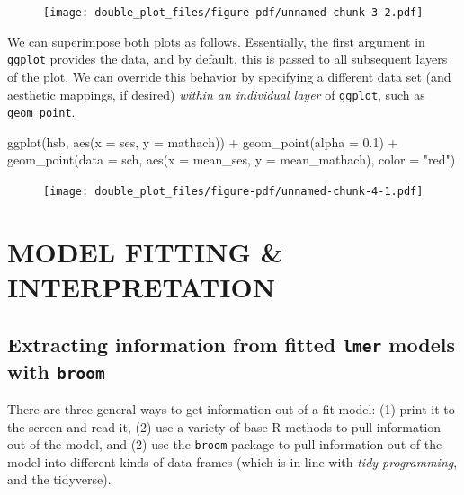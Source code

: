 \documentclass[
  letterpaper,
  DIV=11,
  numbers=noendperiod]{scrreprt}
\newenvironment{Shaded}{\begin{snugshade}}{\end{snugshade}}
\newcommand{\AttributeTok}[1]{\textcolor[rgb]{0.49,0.56,0.16}{#1}}
\newcommand{\FloatTok}[1]{\textcolor[rgb]{0.25,0.63,0.44}{#1}}
\newcommand{\FunctionTok}[1]{\textcolor[rgb]{0.02,0.16,0.49}{#1}}
\newcommand{\NormalTok}[1]{\textcolor[rgb]{0.00,0.44,0.13}{#1}}
\newcommand{\SpecialCharTok}[1]{\textcolor[rgb]{0.25,0.44,0.63}{#1}}
\newcommand{\StringTok}[1]{\textcolor[rgb]{0.25,0.44,0.63}{#1}}
\begin{document}
\begin{figure}[H]

{\centering \texttt{[image: double\_plot\_files/figure-pdf/unnamed-chunk-3-2.pdf]}

}

\end{figure}

We can superimpose both plots as follows. Essentially, the first
argument in \texttt{ggplot} provides the data, and by default, this is
passed to all subsequent layers of the plot. We can override this
behavior by specifying a different data set (and aesthetic mappings, if
desired) \emph{within an individual layer} of \texttt{ggplot}, such as
\texttt{geom\_point}.

\begin{Shaded}
\begin{Highlighting}[]
\FunctionTok{ggplot}\NormalTok{(hsb, }\FunctionTok{aes}\NormalTok{(}\AttributeTok{x =}\NormalTok{ ses, }\AttributeTok{y =}\NormalTok{ mathach)) }\SpecialCharTok{+}
  \FunctionTok{geom\_point}\NormalTok{(}\AttributeTok{alpha =} \FloatTok{0.1}\NormalTok{) }\SpecialCharTok{+}
  \FunctionTok{geom\_point}\NormalTok{(}\AttributeTok{data =}\NormalTok{ sch, }\FunctionTok{aes}\NormalTok{(}\AttributeTok{x =}\NormalTok{ mean\_ses, }\AttributeTok{y =}\NormalTok{ mean\_mathach), }\AttributeTok{color =} \StringTok{"red"}\NormalTok{)}
\end{Highlighting}
\end{Shaded}

\begin{figure}[H]

{\centering \texttt{[image: double\_plot\_files/figure-pdf/unnamed-chunk-4-1.pdf]}

}

\end{figure}

\part{MODEL FITTING \& INTERPRETATION}

\hypertarget{sec-broom}{%
\chapter{\texorpdfstring{Extracting information from fitted
\texttt{lmer} models with
\texttt{broom}}{Extracting information from fitted lmer models with broom}}\label{sec-broom}}

There are three general ways to get information out of a fit model: (1)
print it to the screen and read it, (2) use a variety of base R methods
to pull information out of the model, and (2) use the \texttt{broom}
package to pull information out of the model into different kinds of
data frames (which is in line with \emph{tidy programming}, and the
tidyverse).
\end{document}
